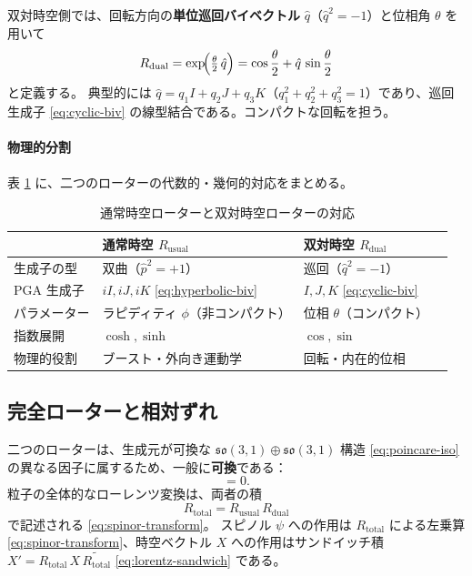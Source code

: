 \documentclass[dvipdfmx,a4paper,oneside]{jsbook}
\numberwithin{equation}{chapter}
\begin{document}
双対時空側では、回転方向の\textbf{単位巡回バイベクトル} \(\hat{q}\)（\(\hat{q}^2 = -1\)）と位相角 \(\theta\) を用いて
\begin{equation}
  R_{\mathrm{dual}}
  = \exp\!\Bigl(\tfrac{\theta}{2}\,\hat{q}\Bigr)
  = \cos\frac{\theta}{2} + \hat{q}\,\sin\frac{\theta}{2}
  \label{eq:R-dual}
\end{equation}
と定義する。
典型的には \(\hat{q} = q_1 I + q_2 J + q_3 K\)（\(q_1^2+q_2^2+q_3^2=1\)）であり、巡回生成子 \eqref{eq:cyclic-biv} の線型結合である。コンパクトな回転を担う。

\paragraph{物理的分割}
表 \ref{tab:usual-dual-rotors} に、二つのローターの代数的・幾何的対応をまとめる。

\begin{table}[htbp]
  \centering
  \caption{通常時空ローターと双対時空ローターの対応}
  \label{tab:usual-dual-rotors}
  \begin{tabular}{@{}llll@{}}
    \toprule
    & 通常時空 \(R_{\mathrm{usual}}\) & 双対時空 \(R_{\mathrm{dual}}\) \\
    \midrule
    生成子の型 & 双曲（\(\hat{p}^2=+1\)） & 巡回（\(\hat{q}^2=-1\)） \\
    PGA 生成子 & \(iI, iJ, iK\) \eqref{eq:hyperbolic-biv} & \(I, J, K\) \eqref{eq:cyclic-biv} \\
    パラメーター & ラピディティ \(\phi\)（非コンパクト） & 位相 \(\theta\)（コンパクト） \\
    指数展開 & \(\cosh,\sinh\) & \(\cos,\sin\) \\
    物理的役割 & ブースト・外向き運動学 & 回転・内在的位相 \\
    \bottomrule
  \end{tabular}
\end{table}

\subsection{完全ローターと相対ずれ}

二つのローターは、生成元が可換な \(\mathfrak{so}(3,1) \oplus \mathfrak{so}(3,1)\) 構造 \eqref{eq:poincare-iso} の異なる因子に属するため、一般に\textbf{可換}である：
\begin{equation}
  [R_{\mathrm{usual}},\, R_{\mathrm{dual}}] = 0.
  \label{eq:rotor-commute}
\end{equation}
粒子の全体的なローレンツ変換は、両者の積
\begin{equation}
  R_{\mathrm{total}} = R_{\mathrm{usual}}\, R_{\mathrm{dual}}
  \label{eq:R-total}
\end{equation}
で記述される \eqref{eq:spinor-transform}。
スピノル \(\psi\) への作用は \(R_{\mathrm{total}}\) による左乗算 \eqref{eq:spinor-transform}、時空ベクトル \(X\) への作用はサンドイッチ積 \(X' = R_{\mathrm{total}}\, X\, \widetilde{R_{\mathrm{total}}}\) \eqref{eq:lorentz-sandwich} である。
\end{document}
